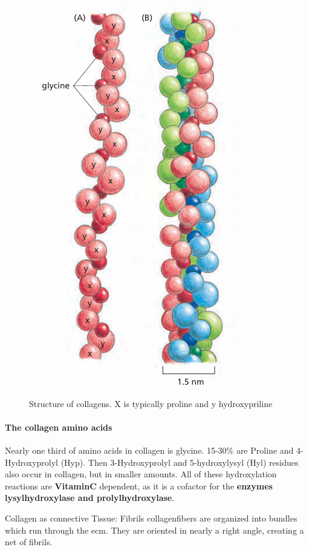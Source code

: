 \documentclass[../main.tex]{subfiles}
\begin{document}
\begin{figure}[H]
	\centering
	\includegraphics[width=0.3\linewidth]{coll_struc}
	\caption{Structure of collagens. X is typically proline and y hydroxypriline}
	\label{fig:collstruc}
\end{figure}

\paragraph{The collagen amino acids}

Nearly one third of amino acids in collagen is glycine. 15-30\% are Proline and 4-Hydroxyprolyl (Hyp).  Then 3-Hydroxyprolyl and 5-\gls{hydroxylysyl} (Hyl) residues also occur in collagen, but in smaller amounts. All of these hydroxylation reactions are \textbf{\gls{VitaminC}} dependent, as it is a cofactor for the \textbf{enzymes \gls{lysylhydroxylase} and \gls{prolylhydroxylase}}.

\begin{RemarkWithTitel}{Collagen as connective Tissue: Fibrils}
	\gls{collagenfibers} are organized into bundles which run through the ecm. They are oriented in nearly a right angle, creating a net of fibrils. 
\end{RemarkWithTitel}
\end{document}
